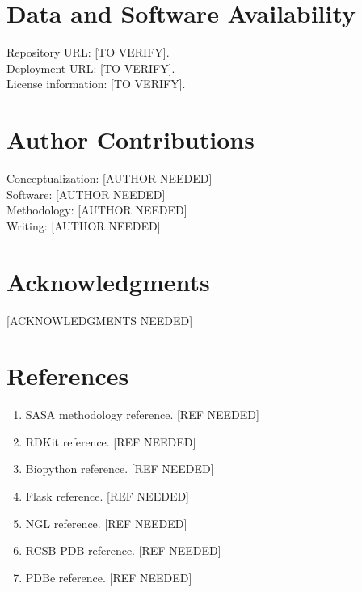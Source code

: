 \documentclass[11pt]{article}
\begin{document}
\section{Data and Software Availability}
Repository URL: [TO VERIFY].\\
Deployment URL: [TO VERIFY].\\
License information: [TO VERIFY].

\section*{Author Contributions}
Conceptualization: [AUTHOR NEEDED]\\
Software: [AUTHOR NEEDED]\\
Methodology: [AUTHOR NEEDED]\\
Writing: [AUTHOR NEEDED]

\section*{Acknowledgments}
[ACKNOWLEDGMENTS NEEDED]

\section*{References}
\begin{enumerate}[leftmargin=*]
  \item SASA methodology reference. [REF NEEDED]
  \item RDKit reference. [REF NEEDED]
  \item Biopython reference. [REF NEEDED]
  \item Flask reference. [REF NEEDED]
  \item NGL reference. [REF NEEDED]
  \item RCSB PDB reference. [REF NEEDED]
  \item PDBe reference. [REF NEEDED]
\end{enumerate}
\end{document}
